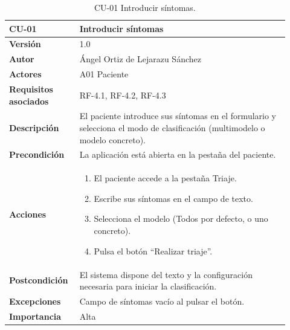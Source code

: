 \begin{table}[H]
	\centering
	\begin{tabular}{ p{0.21\linewidth} p{0.71\linewidth} }
		\toprule
		\textbf{CU-01}    & \textbf{Introducir síntomas}\\
		\toprule
		\textbf{Versión}              & 1.0 \\
		\textbf{Autor}                & Ángel Ortiz de Lejarazu Sánchez \\
		\textbf{Actores}              & A01 Paciente \\
		\textbf{Requisitos asociados} & RF-4.1, RF-4.2, RF-4.3 \\
		\textbf{Descripción}          & El paciente introduce sus síntomas en el formulario y selecciona el modo de clasificación (multimodelo o modelo concreto). \\
		\textbf{Precondición}         & La aplicación está abierta en la pestaña del paciente. \\
		\textbf{Acciones}             &
		\begin{enumerate}
			\def\labelenumi{\arabic{enumi}.}
			\item El paciente accede a la pestaña Triaje.
			\item Escribe sus síntomas en el campo de texto.
			\item Selecciona el modelo (Todos por defecto, o uno concreto).
			\item Pulsa el botón ``Realizar triaje''.
		\end{enumerate} \\
		\textbf{Postcondición}        & El sistema dispone del texto y la configuración necesaria para iniciar la clasificación. \\
		\textbf{Excepciones}          & Campo de síntomas vacío al pulsar el botón. \\
		\textbf{Importancia}          & Alta \\
		\bottomrule
	\end{tabular}
	\caption{CU-01 Introducir síntomas.}
\end{table}

